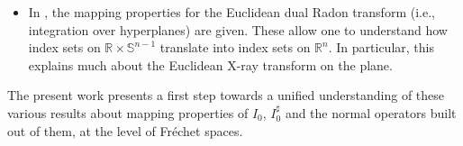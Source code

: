 \documentclass[11pt]{article}
\newcommand{\ie}{i.e.,\xspace}
\def\To#1{\mathchoice{\xrightarrow{\textstyle\kern4pt#1\kern3pt}}{\stackrel{#1}{\longrightarrow}}{}{}}
\theoremstyle{plain}
\theoremstyle{definition}
\theoremstyle{remark}
\def\Sm{\mathbb{S}}
\def\Rm{{\mathbb{R}}}
\newcommand{\adj}{I_0^\sharp}
\newcommand{\wtH}{\widetilde{H}}
\begin{document}
\begin{itemize}
\begin{equation*}
\adj \, \mu^{-1} I_0 \colon \wtH^k(M) \To{\cong} \wtH^{k+1}(M).
\end{equation*}
In other words, by introducing the singular weight $\sfrac{1}{\mu}$, one can identify spaces which are stable under iteration of the modified
normal operator $\adj \, \mu^{-1} I_0$.
\item In \cite{Katsevich2001}, the mapping properties for the Euclidean dual Radon transform (\ie integration over hyperplanes) are given.
These allow one to understand how index sets on $\Rm\times \Sm^{n-1}$ translate into index sets on $\Rm^n$. In particular, this explains
much about the Euclidean X-ray transform on the plane.
\end{itemize}

The present work presents a first step towards a unified understanding of these various results about mapping properties of $I_0$, $\adj $
and the normal operators built out of them, at the level of Fréchet spaces.
\end{document}

